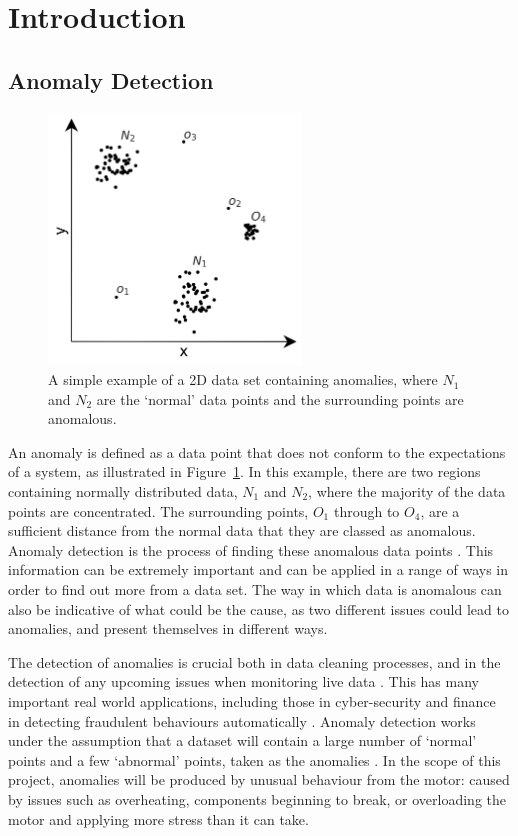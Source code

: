 \section{Introduction}
\label{sec:introduction}

\subsection{Anomaly Detection}
\label{subsec:anomaly_detection}

\begin{figure}[t]
    \centering
    \includegraphics[width=0.6\textwidth]{fig/anomalies.png}
    \caption[Example of Anomalies]{A simple example of a 2D data set containing anomalies, where $N_{1}$ and $N_{2}$ are the `normal' data points and the surrounding points are anomalous.}
    \label{fig:anomalies}
\end{figure}

An anomaly is defined as a data point that does not conform to the expectations of a system, as illustrated in Figure~\ref{fig:anomalies}. In this example, there are two regions containing normally distributed data, $N_{1}$ and $N_{2}$, where the majority of the data points are concentrated. The surrounding points, $O_{1}$ through to $O_{4}$, are a sufficient distance from the normal data that they are classed as anomalous. Anomaly detection is the process of finding these anomalous data points \cite{huang}. This information can be extremely important and can be applied in a range of ways in order to find out more from a data set. The way in which data is anomalous can also be indicative of what could be the cause, as two different issues could lead to anomalies, and present themselves in different ways. 

The detection of anomalies is crucial both in data cleaning processes, and in the detection of any upcoming issues when monitoring live data \cite{Akouemo2016948}. This has many important real world applications, including those in cyber-security and finance in detecting fraudulent behaviours automatically \cite{618940}. Anomaly detection works under the assumption that a dataset will contain a large number of `normal' points and a few `abnormal' points, taken as the anomalies \cite{Pimentel2014215}. In the scope of this project, anomalies will be produced by unusual behaviour from the motor: caused by issues such as overheating, components beginning to break, or overloading the motor and applying more stress than it can take. 

